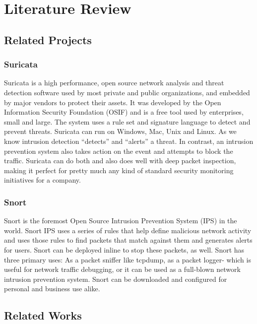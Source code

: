 \chapter{Literature Review}
\vspace{-18pt}
\section{Related Projects}
\vspace{-18pt}
\subsection{Suricata}
\vspace{-18pt}
Suricata is a high performance, open source network analysis and threat detection software used by most private and public organizations, and embedded by major vendors to protect their assets. It was developed by the Open Information Security Foundation (OSIF) and is a free tool used by enterprises, small and large. The system uses a rule set and signature language to detect and prevent threats. Suricata can run on Windows, Mac, Unix and Linux. As we know intrusion detection “detects” and “alerts” a threat. In contrast, an intrusion prevention system also takes action on the event and attempts to block the traffic. Suricata can do both and also does well with deep packet inspection, making it perfect for pretty much any kind of standard security monitoring initiatives for a company.
 \vspace{-10pt}
\subsection{Snort}
\vspace{-18pt}
Snort is the foremost Open Source Intrusion Prevention System (IPS) in the world. Snort IPS uses a series of rules that help define malicious network activity and uses those rules to find packets that match against them and generates alerts for users. Snort can be deployed inline to stop these packets, as well. Snort has three primary uses: As a packet sniffer like tcpdump, as a packet logger- which is useful for network traffic debugging, or it can be used as a full-blown network intrusion prevention system. Snort can be downloaded and configured for personal and business use alike.
\vspace{-10pt}
\section{Related Works}
\vspace{-18pt}
